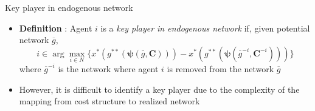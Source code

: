 \documentclass[10pt,dvipdfmx]{beamer}
\begin{document}
\begin{frame}{Key player in endogenous network}
\begin{itemize}
    \item {\bf{Definition}} : Agent $i$ is a {\it{key player in endogenous network}} if, given potential network $\overline{g}$,
        \[ i \in \arg \max_{i \in N} \{ x^*(g^{**}(\bm{\psi}(\overline{g}, \bm{C}))) - x^*(g^{**}(\bm{\psi}(\overline{g}^{-i}, \bm{C}^{-i}))) \} \]
        where ${\overline{g}}^{-i}$ is the network where agent $i$ is removed from the network $\overline{g}$
    \item However, it is difficult to identify a key player due to the complexity of the mapping from cost structure to realized network
\end{itemize}
\end{frame}
\end{document}
